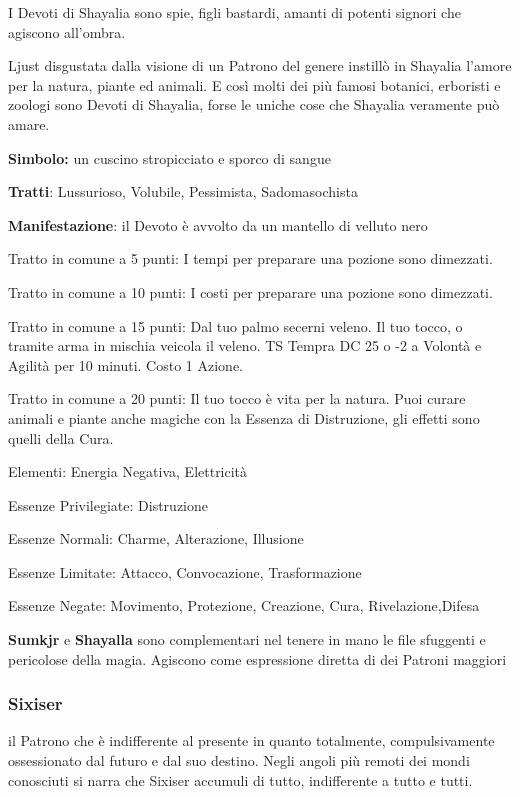 \documentclass[a4paper,11pt,twoside,openany]{book}
\begin{document}
{I Devoti di Shayalia sono spie, figli bastardi, amanti di potenti signori che agiscono all'ombra.

Ljust disgustata dalla visione di un Patrono del genere instillò in Shayalia l'amore per la natura, piante ed animali. E così molti dei più famosi botanici, erboristi e zoologi sono Devoti di Shayalia, forse le uniche cose che Shayalia veramente può amare.

\textbf{Simbolo:} un cuscino stropicciato e sporco di sangue

\textbf{Tratti}: Lussurioso, Volubile, Pessimista, Sadomasochista

\textbf{Manifestazione}: il Devoto è avvolto da un mantello di velluto nero

\bigskip

Tratto in comune a 5 punti: I tempi per preparare una pozione sono dimezzati.

Tratto in comune a 10 punti: I costi per preparare una pozione sono dimezzati.

Tratto in comune a 15 punti: Dal tuo palmo secerni veleno. Il tuo tocco, o tramite arma in mischia veicola il veleno. TS Tempra DC 25 o -2 a Volontà e Agilità per 10 minuti. Costo 1 Azione.

Tratto in comune a 20 punti: Il tuo tocco è vita per la natura. Puoi curare animali e piante anche magiche con la Essenza di Distruzione, gli effetti sono quelli della Cura.

\bigskip

Elementi: Energia Negativa, Elettricità

\bigskip

Essenze Privilegiate: Distruzione

Essenze Normali: Charme, Alterazione, Illusione

Essenze Limitate: Attacco, Convocazione, Trasformazione

Essenze Negate: Movimento, Protezione, Creazione, Cura, Rivelazione,Difesa

\textbf{Sumkjr} e \textbf{Shayalla} sono complementari nel tenere in mano le file sfuggenti e pericolose della magia. Agiscono come espressione diretta di dei Patroni maggiori

\subsubsection{Sixiser}

il Patrono che è indifferente al presente in quanto totalmente, compulsivamente ossessionato dal futuro e dal suo destino. Negli angoli più remoti dei mondi conosciuti si narra che Sixiser accumuli di tutto, indifferente a tutto e tutti. 

}
\end{document}
